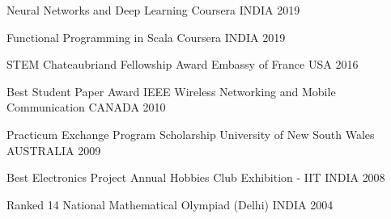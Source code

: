 


\begin{cvhonors}

  \cvhonor
    {Neural Networks and Deep Learning} %
    {Coursera} %
    {INDIA} %
    {2019} %
    
  \cvhonor
    {Functional Programming in Scala} %
    {Coursera} %
    {INDIA} %
    {2019} %
    

  \cvhonor
    {STEM Chateaubriand Fellowship Award} %
    {Embassy of France} %
    {USA} %
    {2016} %

%
  \cvhonor
    {Best Student Paper Award} %
    {IEEE Wireless Networking and Mobile Communication} %
    {CANADA} %
    {2010} %

  \cvhonor
    {Practicum Exchange Program Scholarship} %
    {University of New South Wales} %
    {AUSTRALIA} %
    {2009} %

  \cvhonor
    {Best Electronics Project} %
    {Annual Hobbies Club Exhibition - IIT} %
    {INDIA} %
    {2008} %
    
  \cvhonor
    {Ranked 14} %
    {National Mathematical Olympiad (Delhi)} %
    {INDIA} %
    {2004} %

\end{cvhonors}


